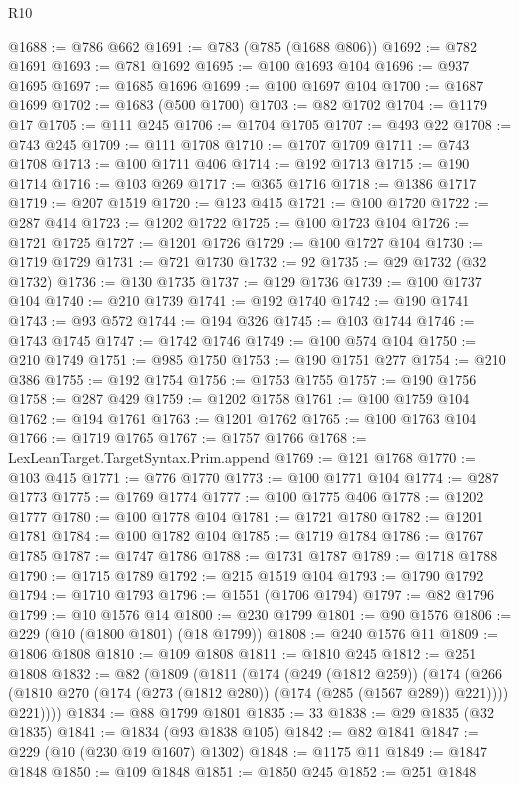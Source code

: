 \begin{lexlean}{R10}
\begin{coremodule}
@1688 := @786 @662
@1691 := @783 (@785 (@1688 @806))
@1692 := @782 @1691
@1693 := @781 @1692
@1695 := @100 @1693 @104
@1696 := @937 @1695
@1697 := @1685 @1696
@1699 := @100 @1697 @104
@1700 := @1687 @1699
@1702 := @1683 (@500 @1700)
@1703 := @82 @1702
@1704 := @1179 @17
@1705 := @111 @245
@1706 := @1704 @1705
@1707 := @493 @22
@1708 := @743 @245
@1709 := @111 @1708
@1710 := @1707 @1709
@1711 := @743 @1708
@1713 := @100 @1711 @406
@1714 := @192 @1713
@1715 := @190 @1714
@1716 := @103 @269
@1717 := @365 @1716
@1718 := @1386 @1717
@1719 := @207 @1519
@1720 := @123 @415
@1721 := @100 @1720
@1722 := @287 @414
@1723 := @1202 @1722
@1725 := @100 @1723 @104
@1726 := @1721 @1725
@1727 := @1201 @1726
@1729 := @100 @1727 @104
@1730 := @1719 @1729
@1731 := @721 @1730
@1732 := 92
@1735 := @29 @1732 (@32 @1732)
@1736 := @130 @1735
@1737 := @129 @1736
@1739 := @100 @1737 @104
@1740 := @210 @1739
@1741 := @192 @1740
@1742 := @190 @1741
@1743 := @93 @572
@1744 := @194 @326
@1745 := @103 @1744
@1746 := @1743 @1745
@1747 := @1742 @1746
@1749 := @100 @574 @104
@1750 := @210 @1749
@1751 := @985 @1750
@1753 := @190 @1751 @277
@1754 := @210 @386
@1755 := @192 @1754
@1756 := @1753 @1755
@1757 := @190 @1756
@1758 := @287 @429
@1759 := @1202 @1758
@1761 := @100 @1759 @104
@1762 := @194 @1761
@1763 := @1201 @1762
@1765 := @100 @1763 @104
@1766 := @1719 @1765
@1767 := @1757 @1766
@1768 := LexLeanTarget.TargetSyntax.Prim.append
@1769 := @121 @1768
@1770 := @103 @415
@1771 := @776 @1770
@1773 := @100 @1771 @104
@1774 := @287 @1773
@1775 := @1769 @1774
@1777 := @100 @1775 @406
@1778 := @1202 @1777
@1780 := @100 @1778 @104
@1781 := @1721 @1780
@1782 := @1201 @1781
@1784 := @100 @1782 @104
@1785 := @1719 @1784
@1786 := @1767 @1785
@1787 := @1747 @1786
@1788 := @1731 @1787
@1789 := @1718 @1788
@1790 := @1715 @1789
@1792 := @215 @1519 @104
@1793 := @1790 @1792
@1794 := @1710 @1793
@1796 := @1551 (@1706 @1794)
@1797 := @82 @1796
@1799 := @10 @1576 @14
@1800 := @230 @1799
@1801 := @90 @1576
@1806 := @229 (@10 (@1800 @1801) (@18 @1799))
@1808 := @240 @1576 @11
@1809 := @1806 @1808
@1810 := @109 @1808
@1811 := @1810 @245
@1812 := @251 @1808
@1832 := @82
    (@1809
      (@1811
        (@174
          (@249 (@1812 @259))
          (@174
            (@266 (@1810 @270 (@174 (@273 (@1812 @280)) (@174 (@285 (@1567 @289)) @221))))
            @221))))
@1834 := @88 @1799 @1801
@1835 := 33
@1838 := @29 @1835 (@32 @1835)
@1841 := @1834 (@93 @1838 @105)
@1842 := @82 @1841
@1847 := @229 (@10 (@230 @19 @1607) @1302)
@1848 := @1175 @11
@1849 := @1847 @1848
@1850 := @109 @1848
@1851 := @1850 @245
@1852 := @251 @1848

\end{coremodule}
\end{lexlean}
